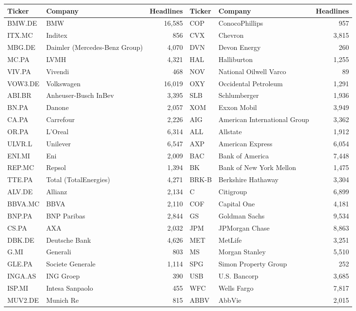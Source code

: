 \begin{tabular}{llrllr}
\toprule
Ticker & Company & Headlines & Ticker & Company & Headlines \\
\midrule
BMW.DE & BMW & 16,585 & COP & ConocoPhillips & 957 \\
ITX.MC & Inditex & 856 & CVX & Chevron & 3,815 \\
MBG.DE & Daimler (Mercedes-Benz Group) & 4,070 & DVN & Devon Energy & 260 \\
MC.PA & LVMH & 4,321 & HAL & Halliburton & 1,255 \\
VIV.PA & Vivendi & 468 & NOV & National Oilwell Varco & 89 \\
VOW3.DE & Volkswagen & 16,019 & OXY & Occidental Petroleum & 1,291 \\
ABI.BR & Anheuser-Busch InBev & 3,395 & SLB & Schlumberger & 1,936 \\
BN.PA & Danone & 2,057 & XOM & Exxon Mobil & 3,949 \\
CA.PA & Carrefour & 2,226 & AIG & American International Group & 3,362 \\
OR.PA & L'Oreal & 6,314 & ALL & Allstate & 1,912 \\
ULVR.L & Unilever & 6,547 & AXP & American Express & 6,054 \\
ENI.MI & Eni & 2,009 & BAC & Bank of America & 7,448 \\
REP.MC & Repsol & 1,394 & BK & Bank of New York Mellon & 1,475 \\
TTE.PA & Total (TotalEnergies) & 4,271 & BRK-B & Berkshire Hathaway & 3,304 \\
ALV.DE & Allianz & 2,134 & C & Citigroup & 6,899 \\
BBVA.MC & BBVA & 2,110 & COF & Capital One & 4,181 \\
BNP.PA & BNP Paribas & 2,844 & GS & Goldman Sachs & 9,534 \\
CS.PA & AXA & 2,032 & JPM & JPMorgan Chase & 8,863 \\
DBK.DE & Deutsche Bank & 4,626 & MET & MetLife & 3,251 \\
G.MI & Generali & 803 & MS & Morgan Stanley & 5,510 \\
GLE.PA & Societe Generale & 1,114 & SPG & Simon Property Group & 252 \\
INGA.AS & ING Groep & 390 & USB & U.S. Bancorp & 3,685 \\
ISP.MI & Intesa Sanpaolo & 455 & WFC & Wells Fargo & 7,817 \\
MUV2.DE & Munich Re & 815 & ABBV & AbbVie & 2,015 \\

\end{tabular}
